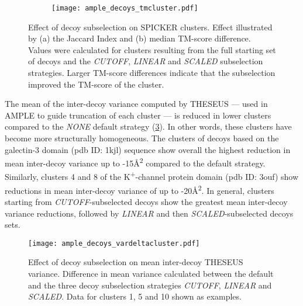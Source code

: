 \begin{figure}[H]\ContinuedFloat
    \begin{subfigure}[b]{\textwidth}
        \texttt{[image: ample\_decoys\_tmcluster.pdf]}
        \caption{}
        \label{fig:ample_decoys_tmcluster}
    \end{subfigure}
    \caption[Effect of decoy subselection on SPICKER clusters]{Effect of decoy subselection on SPICKER clusters. Effect illustrated by (a) the Jaccard Index and (b) median TM-score difference. Values were calculated for clusters resulting from the full starting set of decoys and the \textit{CUTOFF}, \textit{LINEAR} and \textit{SCALED} subselection strategies. Larger TM-score differences indicate that the subselection improved the TM-score of the cluster.}
\end{figure}

The mean of the inter-decoy variance computed by THESEUS --- used in AMPLE to guide truncation of each cluster --- is reduced in lower clusters compared to the \textit{NONE} default strategy (\cref{fig:ample_decoys_vardeltacluster}). In other words, these clusters have become more structurally homogeneous. The clusters of decoys based on the galectin-3 domain (\gls{pdb} ID: 1kjl) sequence show overall the highest reduction in mean inter-decoy variance up to -15\AA\textsuperscript{2} compared to the default strategy. Similarly, clusters 4 and 8 of the K\textsuperscript{+}-channel protein domain (\gls{pdb} ID: 3ouf) show reductions in mean inter-decoy variance of up to -20\AA\textsuperscript{2}. In general, clusters starting from \textit{CUTOFF}-subselected decoys show the greatest mean inter-decoy variance reductions, followed by \textit{LINEAR} and then \textit{SCALED}-subselected decoys sets.

\begin{figure}[H]
    \centering
    \texttt{[image: ample\_decoys\_vardeltacluster.pdf]}
    \caption[Effect of decoy subselection on THESEUS variance]{Effect of decoy subselection on mean inter-decoy THESEUS variance. Difference in mean variance calculated between the default and the three decoy subselection strategies \textit{CUTOFF}, \textit{LINEAR} and \textit{SCALED}. Data for clusters 1, 5 and 10 shown as examples.}
    \label{fig:ample_decoys_vardeltacluster}
\end{figure}

